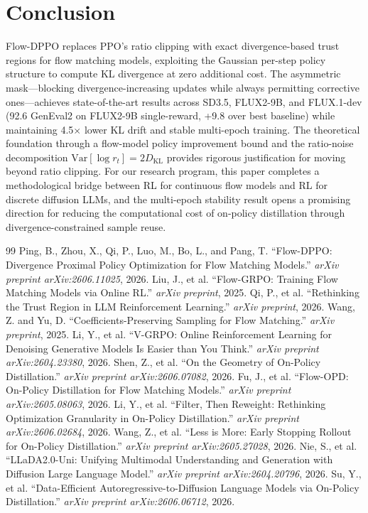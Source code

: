 \documentclass[11pt,a4paper]{article}
\begin{document}
\section{Conclusion}

Flow-DPPO replaces PPO's ratio clipping with exact divergence-based trust regions for flow matching models, exploiting the Gaussian per-step policy structure to compute KL divergence at zero additional cost. The asymmetric mask---blocking divergence-increasing updates while always permitting corrective ones---achieves state-of-the-art results across SD3.5, FLUX2-9B, and FLUX.1-dev (92.6 GenEval2 on FLUX2-9B single-reward, +9.8 over best baseline) while maintaining 4.5$\times$ lower KL drift and stable multi-epoch training. The theoretical foundation through a flow-model policy improvement bound and the ratio-noise decomposition $\mathrm{Var}[\log r_t] = 2D_{\mathrm{KL}}$ provides rigorous justification for moving beyond ratio clipping. For our research program, this paper completes a methodological bridge between RL for continuous flow models and RL for discrete diffusion LLMs, and the multi-epoch stability result opens a promising direction for reducing the computational cost of on-policy distillation through divergence-constrained sample reuse.

\begin{thebibliography}{99}
 Ping, B., Zhou, X., Qi, P., Luo, M., Bo, L., and Pang, T. ``Flow-DPPO: Divergence Proximal Policy Optimization for Flow Matching Models.'' \emph{arXiv preprint arXiv:2606.11025}, 2026.
 Liu, J., et al. ``Flow-GRPO: Training Flow Matching Models via Online RL.'' \emph{arXiv preprint}, 2025.
 Qi, P., et al. ``Rethinking the Trust Region in LLM Reinforcement Learning.'' \emph{arXiv preprint}, 2026.
 Wang, Z. and Yu, D. ``Coefficients-Preserving Sampling for Flow Matching.'' \emph{arXiv preprint}, 2025.
 Li, Y., et al. ``V-GRPO: Online Reinforcement Learning for Denoising Generative Models Is Easier than You Think.'' \emph{arXiv preprint arXiv:2604.23380}, 2026.
 Shen, Z., et al. ``On the Geometry of On-Policy Distillation.'' \emph{arXiv preprint arXiv:2606.07082}, 2026.
 Fu, J., et al. ``Flow-OPD: On-Policy Distillation for Flow Matching Models.'' \emph{arXiv preprint arXiv:2605.08063}, 2026.
 Li, Y., et al. ``Filter, Then Reweight: Rethinking Optimization Granularity in On-Policy Distillation.'' \emph{arXiv preprint arXiv:2606.02684}, 2026.
 Wang, Z., et al. ``Less is More: Early Stopping Rollout for On-Policy Distillation.'' \emph{arXiv preprint arXiv:2605.27028}, 2026.
 Nie, S., et al. ``LLaDA2.0-Uni: Unifying Multimodal Understanding and Generation with Diffusion Large Language Model.'' \emph{arXiv preprint arXiv:2604.20796}, 2026.
 Su, Y., et al. ``Data-Efficient Autoregressive-to-Diffusion Language Models via On-Policy Distillation.'' \emph{arXiv preprint arXiv:2606.06712}, 2026.
\end{thebibliography}
\end{document}
